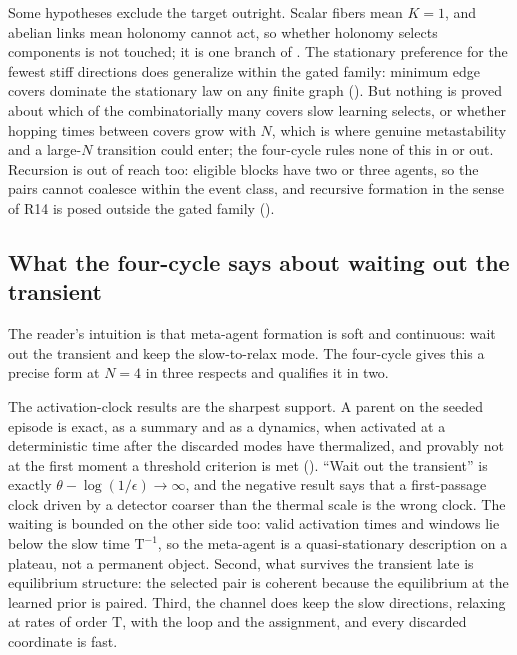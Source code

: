 Some hypotheses exclude the target outright. Scalar fibers mean $K=1$, and abelian links mean holonomy
cannot act, so whether holonomy selects components is not touched; it is one branch of
. The stationary preference for the fewest stiff directions does
generalize within the gated family: minimum edge covers dominate the stationary law on any finite graph
(). But nothing is proved about which of the combinatorially many covers slow
learning selects, or whether hopping times between covers grow with $N$, which is where genuine
metastability and a large-$N$ transition could enter; the four-cycle rules none of this in or out.
Recursion is out of reach too: eligible blocks have two or three agents, so the pairs cannot coalesce
within the event class, and recursive formation in the sense of R14 is posed outside the gated family
().

\subsection{What the four-cycle says about waiting out the transient}

The reader's intuition is that meta-agent formation is soft and continuous: wait out the transient and
keep the slow-to-relax mode. The four-cycle gives this a precise form at $N=4$ in three respects and
qualifies it in two.

The activation-clock results are the sharpest support. A parent on the seeded episode is exact, as a
summary and as a dynamics, when activated at a deterministic time after the discarded modes have
thermalized, and provably not at the first moment a threshold criterion is met
(). ``Wait out the transient'' is
exactly $\theta-\log(1/\epsilon)\to\infty$, and the negative result says that a first-passage clock
driven by a detector coarser than the thermal scale is the wrong clock. The waiting is bounded on the
other side too: valid activation times and windows lie below the slow time $\mathrm T^{-1}$, so the
meta-agent is a quasi-stationary description on a plateau, not a permanent object. Second, what survives
the transient late is equilibrium structure: the selected pair is coherent because the equilibrium at the
learned prior is paired. Third, the channel does keep the slow directions, relaxing at rates of order
$\mathrm T$, with the loop and the assignment, and every discarded coordinate is fast.

